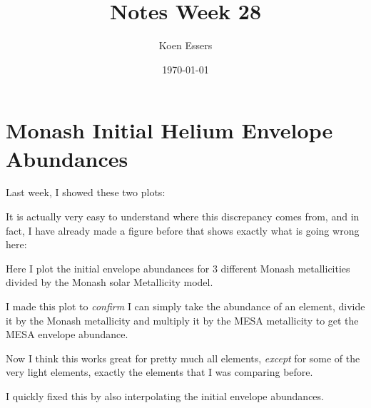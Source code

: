 \documentclass[a4paper,10pt]{article}
\title{Notes Week 28}
\author{Koen Essers}
\date{\today}
\begin{document}
\setuplayout
\section{Monash Initial Helium Envelope Abundances}

Last week, I showed these two plots:

\begin{figure}[ht]
    \centering
\end{figure}

\begin{figure}[ht]
    \centering
\end{figure}

It is actually very easy to understand where this discrepancy comes from, and in fact, I have already made a figure before that shows exactly what is going wrong here:

\begin{figure}[ht]
    \centering
\end{figure}
Here I plot the initial envelope abundances for 3 different Monash metallicities divided by the Monash solar Metallicity model.

I made this plot to \emph{confirm} I can simply take the abundance of an element, divide it by the Monash metallicity and multiply it by the MESA metallicity to get the MESA envelope abundance.

Now I think this works great for pretty much all elements, \emph{except} for some of the very light elements, exactly the elements that I was comparing before.

I quickly fixed this by also interpolating the initial envelope abundances.

\begin{figure}[ht]
    \centering
\end{figure}

\begin{figure}[ht]
    \centering
\end{figure}
\end{document}
